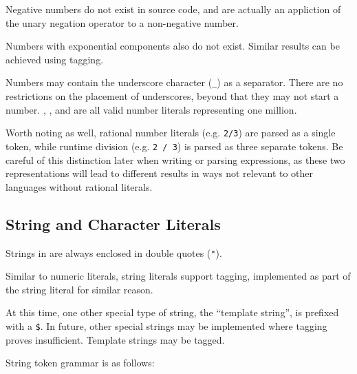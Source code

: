 Negative numbers do not exist in source code, and are actually
an appliction of the unary negation operator \op{-} to a non-negative number.

Numbers with exponential components also do not exist. Similar results
can be achieved using tagging.

Numbers may contain the underscore character (\texttt{\_}) as a separator.
There are no restrictions on the placement of underscores, beyond that they
may not start a number. , , and
 are all valid number literals representing one
million.

Worth noting as well, rational number literals (e.g. \texttt{2/3}) are
parsed as a single token, while runtime division (e.g. \texttt{2 / 3})
is parsed as three separate tokens. Be careful of this distinction later
when writing or parsing expressions, as these two representations will
lead to different results in ways not relevant to other languages without
rational literals.

\subsection{String and Character Literals}

Strings in \Trilogy{} are always enclosed in double quotes (\texttt{"}).

Similar to numeric literals, string literals support tagging, implemented
as part of the string literal for similar reason.

At this time, one other special type of string, the ``template string'',
is prefixed with a \texttt{\$}. In future, other special strings may %
be implemented where tagging proves insufficient. Template strings may
be tagged.

String token grammar is as follows:

\begin{bnf*}
     \\
     \\
     \\
     \\
     \\ %
     \\ %
\end{bnf*}

